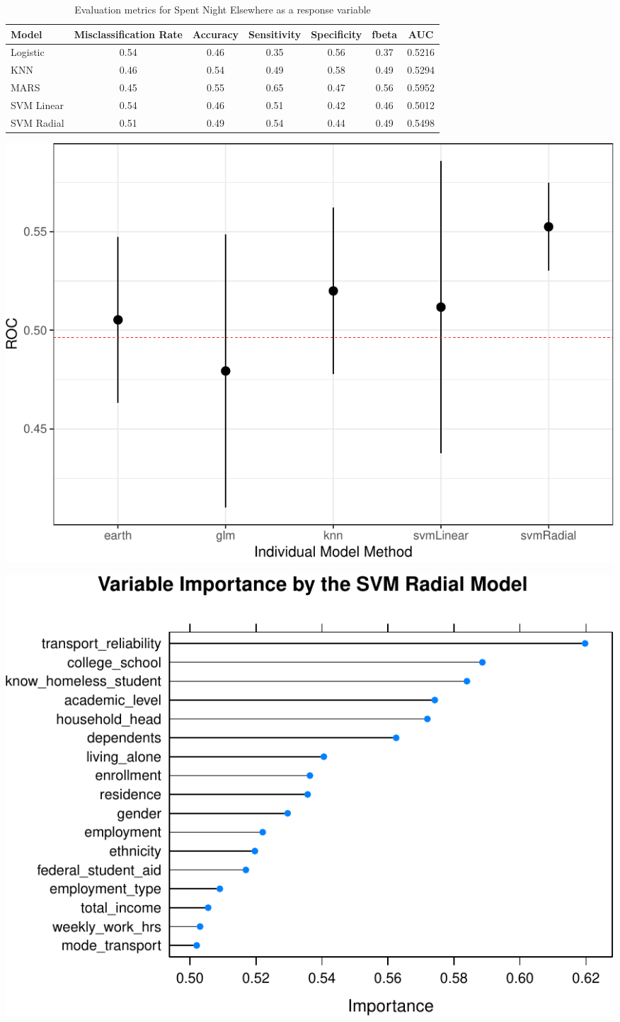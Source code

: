 \documentclass[
  10pt,
]{article}
\begin{document}
\begin{table}[H]

\caption{\label{tab:unnamed-chunk-12}Evaluation metrics for Spent Night Elsewhere  as a response variable}
\centering
\fontsize{12}{14}\selectfont
\begin{tabular}[t]{lcccccc}
\toprule
Model & Misclassification Rate & Accuracy & Sensitivity & Specificity & fbeta & AUC\\
\midrule
Logistic & 0.54 & 0.46 & 0.35 & 0.56 & 0.37 & 0.5216\\
KNN & 0.46 & 0.54 & 0.49 & 0.58 & 0.49 & 0.5294\\
MARS & 0.45 & 0.55 & 0.65 & 0.47 & 0.56 & 0.5952\\
SVM Linear & 0.54 & 0.46 & 0.51 & 0.42 & 0.46 & 0.5012\\
SVM Radial & 0.51 & 0.49 & 0.54 & 0.44 & 0.49 & 0.5498\\
\bottomrule
\end{tabular}
\end{table}

\begin{center}\includegraphics{phase2_report_files/figure-latex/unnamed-chunk-13-1} \end{center}

\begin{center}\includegraphics{phase2_report_files/figure-latex/unnamed-chunk-14-1} \end{center}
\end{document}

